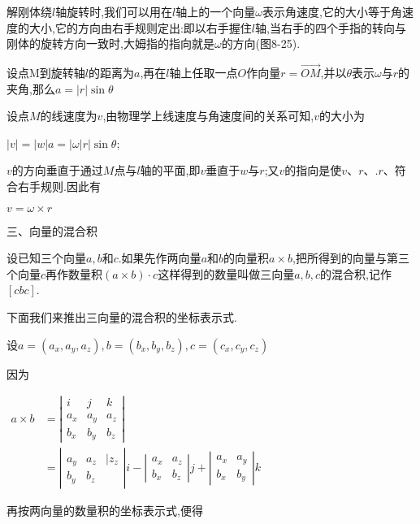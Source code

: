 \documentclass[oneside]{book}
\begin{document}
解刚体绕$l$轴旋转时,我们可以用在$l$轴上的一个向量$\omega $表示角速度,它的大小等于角速度的大小,它的方向由右手规则定出:即以右手握住$l$轴,当右手的四个手指的转向与刚体的旋转方向一致时,大姆指的指向就是$\omega $的方向(图8-25).

设点M到旋转轴$l$的距离为$a$,再在$l$轴上任取一点$O$作向量$r = \overrightarrow {OM} $,并以$\theta $表示$\omega $与$r$的夹角,那么$a = |r|\sin \theta $

设点$M$的线速度为$v$,由物理学上线速度与角速度间的关系可知,$v$的大小为

$\left| v \right| = \left| w \right|a = \left| {\omega |r} \right|{{\sin}}\theta $;

$v$的方向垂直于通过$M$点与$l$轴的平面,即$v$垂直于$w$与$r$;又$v$的指向是使$v$、$r$、.$r$、符合右手规则.因此有

$v = \omega  \times r$

三、向量的混合积

设已知三个向量$a,b$和$c$.如果先作两向量$a$和$b$的向量积$a \times b$,把所得到的向量与第三个向量$c$再作数量积$\left( {a \times b} \right) \cdot c$这样得到的数量叫做三向量$a,b,c$的混合积,记作$\left[ {cbc} \right]$.

下面我们来推出三向量的混合积的坐标表示式.

设$a = ({a_x},{a_y},{a_z}),b = \left( {{b_x},{b_y},{b_z}} \right),c = ({c_x},{c_y},{c_z})$

因为

$\begin{aligned} a \times b &=\left|\begin{array}{lll}{i} & {j} & {k} \\ {a_{x}} & {a_{y}} & {a_{z}} \\ {b_{x}} & {b_{y}} & {b_{z}}\end{array}\right| \\ &=\left|\begin{array}{lll}{a_{y}} & {a_{z}} & {| z_{z}} \\ {b_{y}} & {b_{z}}\end{array}\right| i-\left|\begin{array}{cc}{a_{x}} & {a_{z}} \\ {b_{x}} & {b_{z}}\end{array}\right| j+\left|\begin{array}{ll}{a_{x}} & {a_{y}} \\ {b_{x}} & {b_{y}}\end{array}\right| k \end{aligned}$

再按两向量的数量积的坐标表示式,便得
\end{document}
